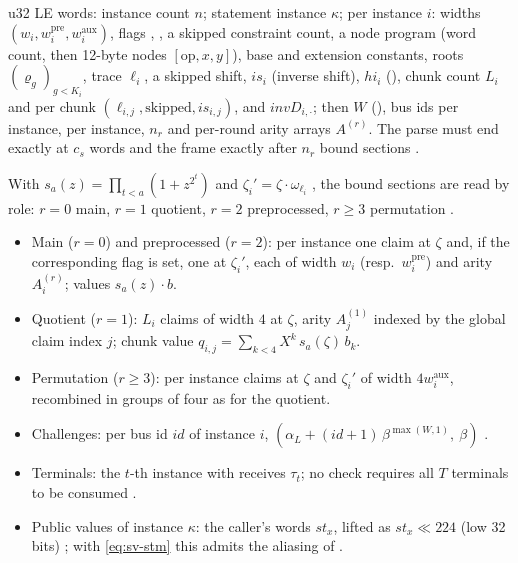 \begin{definition}
\label{def:sv-cs}
u32 LE words: instance count $n$; statement instance $\kappa$; per instance $i$:
widths $(w_i, w_i^{\mathrm{pre}}, w_i^{\mathrm{aux}})$, flags
, , a skipped constraint count, a node program
(word count, then 12-byte nodes $[\mathrm{op}, x, y]$), base and extension
constants, roots $(\varrho_g)_{g<K_i}$, trace $\ell_i$, a skipped shift,
$\mathit{is}_i$ (inverse shift), $\mathit{hi}_i$ (), chunk count
$L_i$ and per chunk $(\ell_{i,j}, \text{skipped}, \mathit{is}_{i,j})$, and
$\mathit{invD}_{i,\cdot}$; then $W$ (), bus ids per instance,
 per instance, $n_r$ and per-round arity arrays $A^{(r)}$. The
parse must end exactly at $c_s$ words and the frame exactly after $n_r$ bound
sections .
\end{definition}

\begin{definition}
\label{def:sv-opened}
With $s_a(z) = \prod_{t<a}(1+z^{2^t})$  and
$\zeta_i' = \zeta\cdot\omega_{\ell_i}$ , the
bound sections are read by role: $r=0$ main, $r=1$ quotient, $r=2$ preprocessed,
$r\ge 3$ permutation .
\begin{itemize}
\item Main ($r=0$) and preprocessed ($r=2$): per instance one claim at $\zeta$ and,
  if the corresponding  flag is set, one at $\zeta_i'$, each of width
  $w_i$ (resp.\ $w_i^{\mathrm{pre}}$) and arity $A^{(r)}_i$; values
  $s_{a}(z)\cdot b$.
\item Quotient ($r=1$): $L_i$ claims of width $4$ at $\zeta$, arity $A^{(1)}_j$
  indexed by the global claim index $j$; chunk value
  $q_{i,j} = \sum_{k<4} X^k\, s_a(\zeta)\, b_k$.
\item Permutation ($r\ge3$): per instance claims at $\zeta$ and $\zeta_i'$ of width
  $4w_i^{\mathrm{aux}}$, recombined in groups of four as for the quotient.
\item Challenges: per bus id $\mathit{id}$ of instance $i$,
  $(\alpha_L + (\mathit{id}+1)\,\beta^{\max(W,1)},\ \beta)$
  .
\item Terminals: the $t$-th instance with  receives $\tau_t$;
  no check requires all $T$ terminals to be consumed
   .
\item Public values of instance $\kappa$: the caller's words $\mathit{st}_x$,
  lifted as $\mathit{st}_x \ll 224$ (low 32 bits) 
  ; with \eqref{eq:sv-stm} this admits the
  aliasing of .
\end{itemize}
\end{definition}

